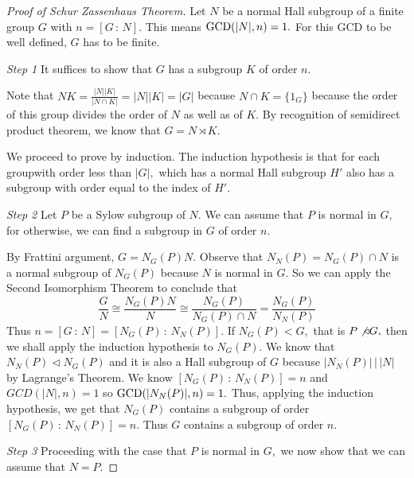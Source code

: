 \begin{proof}[Proof of Schur Zassenhaus Theorem]
	Let $N$ be a normal Hall subgroup of a finite group $G$ with
	$ n = [G \, : \, N].$ This means $\operatorname{GCD}( \lvert N \rvert, n) = 1.$
	For this GCD to be well defined, $G$ has to be finite.
	
	\emph{Step 1 }\quad It suffices to show that $G$ has a 
	subgroup $K$ of order $n.$

	Note that $NK = 
	\frac{ \lvert N \rvert \lvert K \rvert}{ \lvert N \cap K \rvert}
	 = \lvert N \rvert \lvert K \rvert = \lvert G \rvert$
	because $N \cap K = \{ 1_G \}$ because the order of this group
	divides the order of $N$ as well as of $K.$
	By recognition of semidirect product theorem, we know that
	$G = N \rtimes K.$

	We proceed to prove by induction. The induction hypothesis
	is that for each groupwith order less than $ \lvert G \rvert,$
	which has a normal Hall subgroup $H'$ also has a subgroup
	with order equal to the index of $H'.$

	\emph{Step 2} \quad Let $P$ be a Sylow subgroup of $N.$
	We can assume that $P$ is normal in $G,$ for otherwise, 
	we can find a subgroup in $G$ of order $n.$

	By Frattini argument,
	$ G = N_G(P) N.$ Observe that $ N_N(P) = N_G(P) \cap N $ 
	is a normal subgroup of $N_G(P) $ because $N$
	is normal in $G.$ So we can apply the Second Isomorphism Theorem
	to conclude that
	$$ \frac{G}{N} \cong \frac{N_G(P) N}{N} \cong
	\frac{N_G(P)}{N_G(P) \cap N} = \frac{N_G(P)}{ N_N(P)} $$
	Thus $ n = [G \, : \, N] = [ N_G(P) \, : \, N_N(P) ].$ If
	$N_G(P) < G,$ that is $ P \not \triangleleft G,$ then we shall
	apply the induction hypothesis to $N_G(P).$ We know that
	$N_N(P) \triangleleft N_G(P) $ and it is also a Hall subgroup
	of $G$ because $ \lvert N_N(P) \rvert \, | \, \lvert N \rvert$ by
	Lagrange's Theorem. We know
	$ [ N_G(P) \, : \, N_N(P) ] = n$ and $ GCD( \lvert N \rvert,
	n ) = 1$ so $\operatorname{GCD}( \lvert N_N(P) \rvert, n) = 1.$
	Thus, applying the induction hypothesis, we get that
	$N_G(P)$ contains a subgroup of order $[ N_G(P) \, : \, 
	N_N(P)] = n.$ Thus $G$ contains a subgroup of order $n.$

	\emph{Step 3} \quad Proceeding with the case that $P$ is normal in $G,$ we now show that we can assume that $N = P.$


\end{proof}
